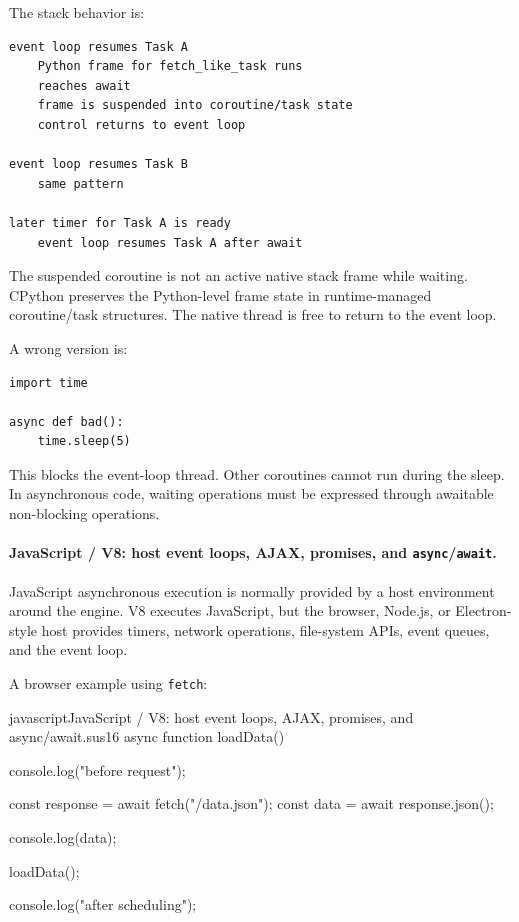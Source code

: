 The stack behavior is:

\begin{verbatim}
event loop resumes Task A
    Python frame for fetch_like_task runs
    reaches await
    frame is suspended into coroutine/task state
    control returns to event loop

event loop resumes Task B
    same pattern

later timer for Task A is ready
    event loop resumes Task A after await
\end{verbatim}

The suspended coroutine is not an active native stack frame while waiting. CPython preserves the Python-level frame state in runtime-managed coroutine/task structures. The native thread is free to return to the event loop.

A wrong version is:

\begin{verbatim}
import time

async def bad():
    time.sleep(5)
\end{verbatim}

This blocks the event-loop thread. Other coroutines cannot run during the sleep. In asynchronous code, waiting operations must be expressed through awaitable non-blocking operations.

\paragraph{JavaScript / V8: host event loops, AJAX, promises, and \texttt{async}/\texttt{await}.}

JavaScript asynchronous execution is normally provided by a host environment around the engine. V8 executes JavaScript, but the browser, Node.js, or Electron-style host provides timers, network operations, file-system APIs, event queues, and the event loop.

A browser example using \texttt{fetch}:

\begin{codebox}[]{javascript}{JavaScript / V8: host event loops, AJAX, promises, and async/await.}{sus16}
async function loadData() {
    console.log("before request");

    const response = await fetch("/data.json");
    const data = await response.json();

    console.log(data);
}

loadData();

console.log("after scheduling");
\end{codebox}


